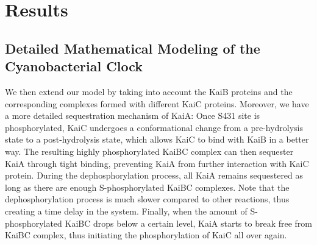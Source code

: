 \documentclass[a4paper,10pt]{article}
\numberwithin{equation}{section}
\begin{document}
\section{Results}



\subsection{Detailed Mathematical Modeling of the Cyanobacterial Clock}
We then extend our model by taking into account the KaiB proteins and the corresponding complexes formed with different KaiC proteins. Moreover, we have a more detailed sequestration mechanism of KaiA: Once S431 site is phosphorylated, KaiC undergoes a conformational change from a pre-hydrolysis state to a post-hydrolysis state, which allows KaiC to bind with KaiB in a better way. The resulting highly phosphorylated KaiBC complex can then sequester KaiA through tight binding, preventing KaiA from further interaction with KaiC protein. During the dephosphorylation process, all KaiA remains sequestered as long as there are enough S-phosphorylated KaiBC complexes. Note that the dephosphorylation process is much slower compared to other reactions, thus creating a time delay in the system. Finally, when the amount of S-phosphorylated KaiBC drops below a certain level, KaiA starts to break free from KaiBC complex, thus initiating the phosphorylation of KaiC all over again. 
\end{document}
